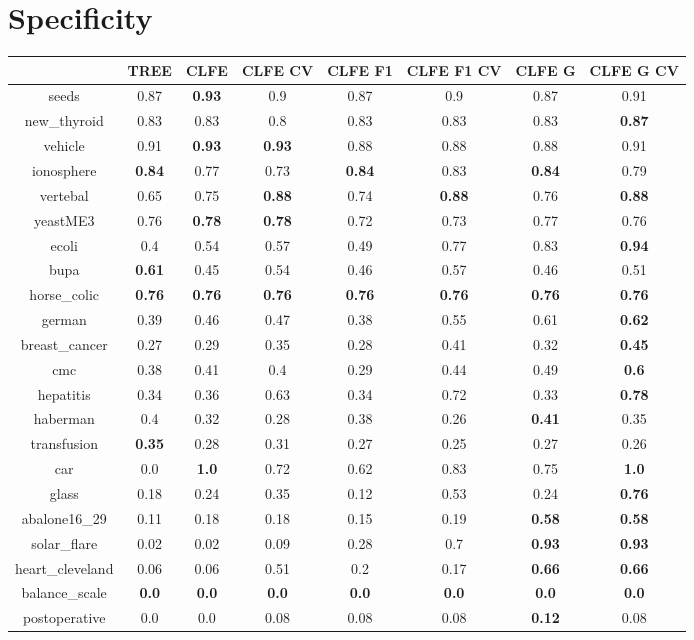 \documentclass{article}%
\begin{document}
%
\section*{Specificity}%
\begin{tabular}{c|ccccccc}%
\hline%
&TREE&CLFE&CLFE CV&CLFE F1&CLFE F1 CV&CLFE G&CLFE G CV\\%
\hline%
seeds&0.87&\textbf{0.93}&0.9&0.87&0.9&0.87&0.91\\%
new\_thyroid&0.83&0.83&0.8&0.83&0.83&0.83&\textbf{0.87}\\%
vehicle&0.91&\textbf{0.93}&\textbf{0.93}&0.88&0.88&0.88&0.91\\%
ionosphere&\textbf{0.84}&0.77&0.73&\textbf{0.84}&0.83&\textbf{0.84}&0.79\\%
vertebal&0.65&0.75&\textbf{0.88}&0.74&\textbf{0.88}&0.76&\textbf{0.88}\\%
yeastME3&0.76&\textbf{0.78}&\textbf{0.78}&0.72&0.73&0.77&0.76\\%
ecoli&0.4&0.54&0.57&0.49&0.77&0.83&\textbf{0.94}\\%
bupa&\textbf{0.61}&0.45&0.54&0.46&0.57&0.46&0.51\\%
horse\_colic&\textbf{0.76}&\textbf{0.76}&\textbf{0.76}&\textbf{0.76}&\textbf{0.76}&\textbf{0.76}&\textbf{0.76}\\%
german&0.39&0.46&0.47&0.38&0.55&0.61&\textbf{0.62}\\%
breast\_cancer&0.27&0.29&0.35&0.28&0.41&0.32&\textbf{0.45}\\%
cmc&0.38&0.41&0.4&0.29&0.44&0.49&\textbf{0.6}\\%
hepatitis&0.34&0.36&0.63&0.34&0.72&0.33&\textbf{0.78}\\%
haberman&0.4&0.32&0.28&0.38&0.26&\textbf{0.41}&0.35\\%
transfusion&\textbf{0.35}&0.28&0.31&0.27&0.25&0.27&0.26\\%
car&0.0&\textbf{1.0}&0.72&0.62&0.83&0.75&\textbf{1.0}\\%
glass&0.18&0.24&0.35&0.12&0.53&0.24&\textbf{0.76}\\%
abalone16\_29&0.11&0.18&0.18&0.15&0.19&\textbf{0.58}&\textbf{0.58}\\%
solar\_flare&0.02&0.02&0.09&0.28&0.7&\textbf{0.93}&\textbf{0.93}\\%
heart\_cleveland&0.06&0.06&0.51&0.2&0.17&\textbf{0.66}&\textbf{0.66}\\%
balance\_scale&\textbf{0.0}&\textbf{0.0}&\textbf{0.0}&\textbf{0.0}&\textbf{0.0}&\textbf{0.0}&\textbf{0.0}\\%
postoperative&0.0&0.0&0.08&0.08&0.08&\textbf{0.12}&0.08\\%
\end{tabular}
\end{document}
